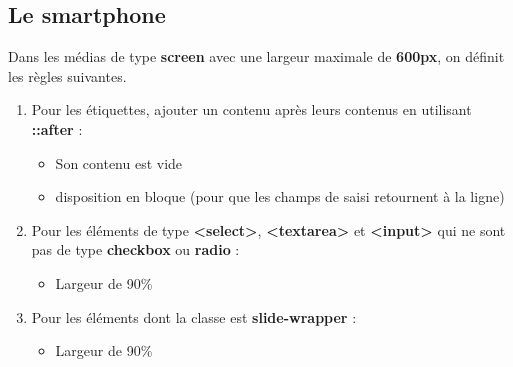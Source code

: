 \documentclass[11pt, a4paper]{article}
\begin{document}
\subsection*{Le smartphone}

Dans les médias de type \textbf{screen} avec une largeur maximale de \textbf{600px}, on définit les règles suivantes.

\begin{enumerate}
	\item Pour les étiquettes, ajouter un contenu après leurs contenus en utilisant \textbf{::after} :
	\begin{multicols}{2}
	\begin{itemize}
		\item Son contenu est vide
		\item disposition en bloque (pour que les champs de saisi retournent à la ligne)
	\end{itemize} 
	\end{multicols}
	\item Pour les éléments de type \textbf{<select>}, \textbf{<textarea>} et \textbf{<input>} qui ne sont pas de type \textbf{checkbox} ou \textbf{radio} :
	\begin{itemize}
		\item Largeur de 90\%
	\end{itemize}
	\item Pour les éléments dont la classe est \textbf{slide-wrapper} :
	\begin{itemize}
		\item Largeur de 90\%
	\end{itemize}  
\end{enumerate}
\end{document}
